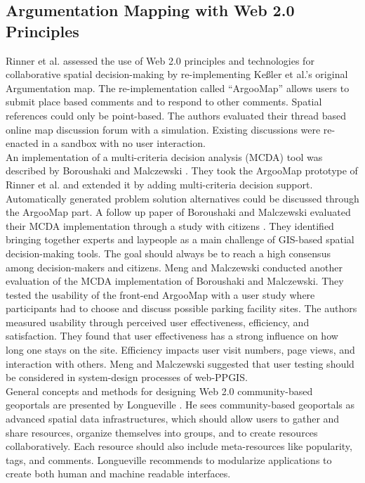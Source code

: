 \subsection{Argumentation Mapping with Web 2.0 Principles}
\label{zweifuenf}
Rinner \cite{Rinner2009_Web2_argumap} et al. assessed the use of Web 2.0 principles and technologies for collaborative spatial decision-making by re-implementing Ke{\ss}ler et al.'s \cite{Kessler2005_ArgumentationMapPrototype} original Argumentation map. The re-implementation called ``ArgooMap'' allows users to submit place based comments and to respond to other comments. Spatial references could only be point-based. The authors evaluated their thread based online map discussion forum with a simulation. Existing discussions were re-enacted in a sandbox with no user interaction.\\
An implementation of a multi-criteria decision analysis (MCDA) tool was described by Boroushaki and Malczewski \cite{Boroushaki2010_ParticipatoryGIS}. They took the ArgooMap prototype of Rinner et al. \cite{Rinner2009_Web2_argumap} and extended it by adding multi-criteria decision support. Automatically generated problem solution alternatives could be discussed through the ArgooMap part. A follow up paper of Boroushaki and Malczewski evaluated their MCDA implementation through a study with citizens \cite{Boroushaki2010_Consensus_measurement}. They identified bringing together experts and laypeople as a main challenge of GIS-based spatial decision-making tools. The goal should always be to reach a high consensus among decision-makers and citizens. Meng and Malczewski \cite{Meng2010_ArgooMap_evaluation} conducted another evaluation of the MCDA implementation of Boroushaki and Malczewski. They tested the usability of the front-end ArgooMap with a user study where participants had to choose and discuss possible parking facility sites. The authors measured usability through perceived user effectiveness, efficiency, and satisfaction. They found that user effectiveness has a strong influence on how long one stays on the site. Efficiency impacts user visit numbers, page views, and interaction with others. Meng and Malczewski suggested that user testing should be considered in system-design processes of web-PPGIS. \\
General concepts and methods for designing Web 2.0 community-based geoportals are presented by Longueville \cite{Longueville2010_community_based_geoportals_web20}. He sees community-based geoportals as advanced spatial data infrastructures, which should allow users to gather and share resources, organize themselves into groups, and to create resources collaboratively. Each resource should also include meta-resources like popularity, tags, and comments. Longueville recommends to modularize applications to create both human and machine readable interfaces.\\
